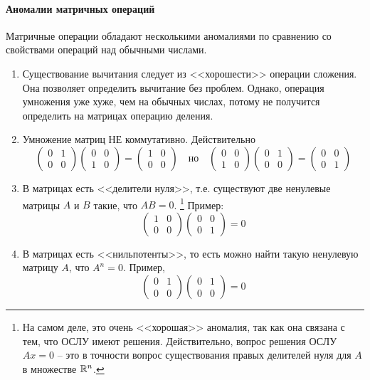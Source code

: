\paragraph{Аномалии матричных операций}

Матричные операции обладают несколькими аномалиями по сравнению со свойствами операций над обычными числами.
\begin{enumerate}
\item Существование вычитания следует из <<хорошести>> операции сложения.
Она позволяет определить вычитание без проблем.
Однако, операция умножения уже хуже, чем на обычных числах, потому не получится определить на матрицах операцию деления.

\item Умножение матриц НЕ коммутативно.
Действительно 
\[
\begin{pmatrix}
{0}&{1}\\
{0}&{0}
\end{pmatrix}
\begin{pmatrix}
{0}&{0}\\
{1}&{0}
\end{pmatrix}
=
\begin{pmatrix}
{1}&{0}\\
{0}&{0}
\end{pmatrix}\quad\text{но}\quad
\begin{pmatrix}
{0}&{0}\\
{1}&{0}
\end{pmatrix}
\begin{pmatrix}
{0}&{1}\\
{0}&{0}
\end{pmatrix}
=\begin{pmatrix}
{0}&{0}\\
{0}&{1}
\end{pmatrix}
\]

\item В матрицах есть <<делители нуля>>, т.е. существуют две ненулевые матрицы $A$ и $B$ такие, что $AB = 0$.%
\footnote{На самом деле, это очень <<хорошая>> аномалия, так как она связана с тем, что ОСЛУ имеют решения.
Действительно, вопрос решения ОСЛУ $Ax = 0$ -- это в точности вопрос существования правых делителей нуля для $A$ в множестве $\mathbb R^{n}$.}
Пример:
\[
\begin{pmatrix}
{1}&{0}\\
{0}&{0}
\end{pmatrix}
\begin{pmatrix}
{0}&{0}\\
{0}&{1}
\end{pmatrix}
=0
\]

\item В матрицах есть <<нильпотенты>>, то есть можно найти такую ненулевую матрицу $A$, что $A^n=0$.
Пример, 
\[
\begin{pmatrix}
{0}&{1}\\
{0}&{0}
\end{pmatrix}
\begin{pmatrix}
{0}&{1}\\
{0}&{0}
\end{pmatrix}
=0
\]
\end{enumerate}

